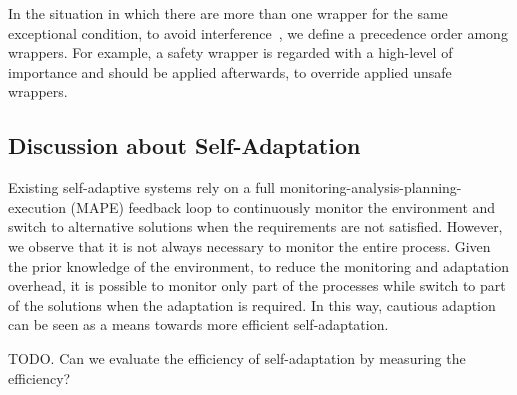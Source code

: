 


In the situation in which there are more than one wrapper for the same exceptional condition, to avoid interference~\cite{Katz:2008:IAI:1394496.1394500}, we define a precedence order among wrappers. For example, a safety wrapper is regarded with a high-level of importance and should be applied afterwards, to override applied unsafe wrappers. 

\subsection{Discussion about Self-Adaptation}

Existing self-adaptive systems rely on a full monitoring-analysis-planning-execution (MAPE) feedback loop to continuously monitor the environment and switch to alternative solutions when the requirements are not satisfied.
However, we observe that it is not always necessary to monitor the entire process. Given the prior knowledge of the environment, to reduce the monitoring and adaptation overhead, it is possible to monitor only part of the processes while switch to part of the solutions when the adaptation is required. 
In this way, cautious adaption can be seen as a means towards more efficient self-adaptation.

TODO. Can we evaluate the efficiency of self-adaptation by measuring the efficiency?